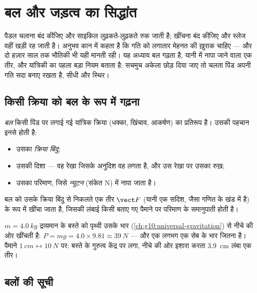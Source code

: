 \chapter{बल और जड़त्व का सिद्धांत}\label{ch:g10:inertia}

पैडल चलाना बंद कीजिए और साइकिल लुढ़कते-लुढ़कते रुक जाती है; खींचना बंद
कीजिए और स्लेज वहीं खड़ी रह जाती है। अनुभव कान में कहता है कि गति को
लगातार मेहनत की ख़ुराक चाहिए --- और दो हज़ार साल तक भौतिकी भी यही मानती
रही। यह अध्याय बल गढ़ता है, यानी  में नापा जाने वाला
एक तीर, और यांत्रिकी का पहला बड़ा नियम बताता है: सचमुच अकेला छोड़ दिया
जाए तो चलता पिंड अपनी गति सदा बनाए रखता है, सीधी और स्थिर।

\section{किसी क्रिया को बल के रूप में गढ़ना}

\begin{definition}[बल]\label{def:g10:inertia:force}
\emph{बल} किसी पिंड पर लगाई गई यांत्रिक क्रिया (धक्का, खिंचाव,
आकर्षण) का प्रतिरूप है। उसकी पहचान इनसे होती है:
\begin{itemize}
  \item उसका \emph{क्रिया बिंदु};
  \item उसकी दिशा --- वह रेखा जिसके अनुदिश वह लगता है, और उस रेखा पर
        उसका रुख़;
  \item उसका परिमाण, जिसे \emph{न्यूटन} (संकेत \unit{N}) में
        नापा जाता है।
\end{itemize}
बल को उसके क्रिया बिंदु से निकलते एक तीर $\vect F$ (यानी एक सदिश, जैसा गणित
के खंड में है) के रूप में खींचा जाता है, जिसकी लंबाई किसी बताए गए पैमाने
पर परिमाण के समानुपाती होती है।
\end{definition}

\begin{example}[बस्ते का भार]\label{ex:g10:inertia:schoolbag}
$m = \qty{4.0}{kg}$ द्रव्यमान के बस्ते को पृथ्वी उसके भार (\cref{ch:g10:universal-gravitation}) से नीचे की ओर
खींचती है: $P = mg = 4.0 \times 9.81 \approx \qty{39}{N}$ --- और एक  लगभग एक सेब के भार
जितना है। पैमाने $\qty{1}{cm} \leftrightarrow
\qty{10}{N}$ पर: बस्ते के गुरुत्व केंद्र पर लगा, नीचे की ओर
इशारा करता \qty{3.9}{cm} लंबा एक  तीर।
\end{example}

\section{बलों की सूची}

